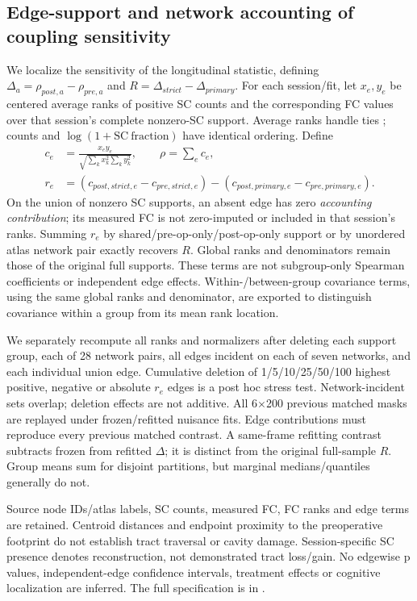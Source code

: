 \documentclass[11pt,a4paper]{article}
\begin{document}
\subsection{Edge-support and network accounting of coupling sensitivity}\label{sec:edgemethod}
We localize the sensitivity of the longitudinal statistic, defining $\Delta_a=\rho_{post,a}-\rho_{pre,a}$ and $R=\Delta_{strict}-\Delta_{primary}$. For each session/fit, let $x_e,y_e$ be centered average ranks of positive SC counts and the corresponding FC values over that session's complete nonzero-SC support. Average ranks handle ties \citep{scipyranks}; counts and $\log(1+\mathrm{SC\ fraction})$ have identical ordering. Define
\begin{align}
 c_e&=\frac{x_e y_e}{\sqrt{\sum_k x_k^2\sum_k y_k^2}},\qquad \rho=\sum_e c_e,\\
 r_e&=(c_{post,strict,e}-c_{pre,strict,e})-(c_{post,primary,e}-c_{pre,primary,e}).
\end{align}
On the union of nonzero SC supports, an absent edge has zero \emph{accounting contribution}; its measured FC is not zero-imputed or included in that session's ranks. Summing $r_e$ by shared/pre-op-only/post-op-only support or by unordered atlas network pair exactly recovers $R$. Global ranks and denominators remain those of the original full supports. These terms are not subgroup-only Spearman coefficients or independent edge effects. Within-/between-group covariance terms, using the same global ranks and denominator, are exported to distinguish covariance within a group from its mean rank location.

We separately recompute all ranks and normalizers after deleting each support group, each of 28 network pairs, all edges incident on each of seven networks, and each individual union edge. Cumulative deletion of 1/5/10/25/50/100 highest positive, negative or absolute $r_e$ edges is a post hoc stress test. Network-incident sets overlap; deletion effects are not additive. All 6$\times$200 previous matched masks are replayed under frozen/refitted nuisance fits. Edge contributions must reproduce every previous matched contrast. A same-frame refitting contrast subtracts frozen from refitted $\Delta$; it is distinct from the original full-sample $R$. Group means sum for disjoint partitions, but marginal medians/quantiles generally do not.

Source node IDs/atlas labels, SC counts, measured FC, FC ranks and edge terms are retained. Centroid distances and endpoint proximity to the preoperative footprint do not establish tract traversal or cavity damage. Session-specific SC presence denotes reconstruction, not demonstrated tract loss/gain. No edgewise p values, independent-edge confidence intervals, treatment effects or cognitive localization are inferred. The full specification is in .
\end{document}
